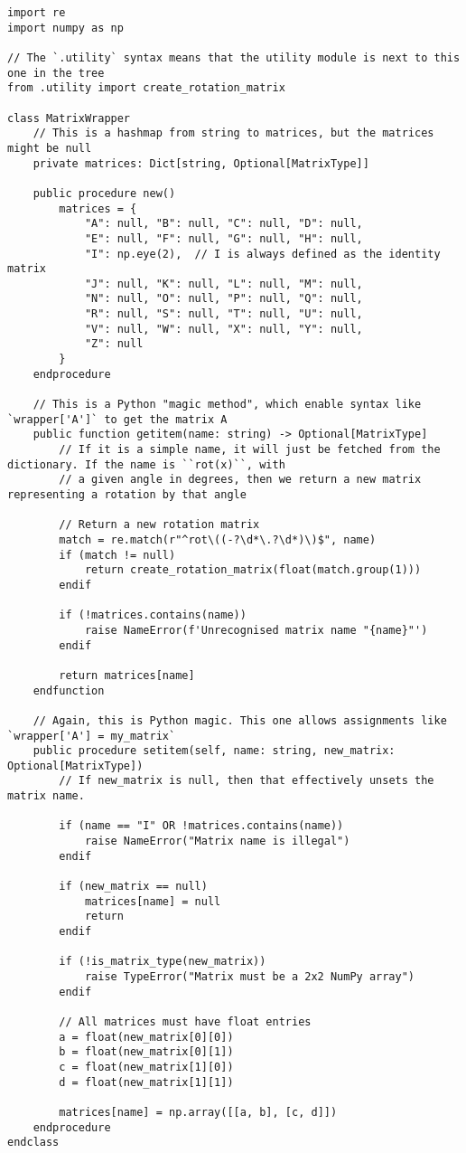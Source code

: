\documentclass[../main.tex]{subfiles}
\begin{document}
\begin{verbatim}
import re
import numpy as np

// The `.utility` syntax means that the utility module is next to this one in the tree
from .utility import create_rotation_matrix

class MatrixWrapper
	// This is a hashmap from string to matrices, but the matrices might be null
	private matrices: Dict[string, Optional[MatrixType]]

	public procedure new()
		matrices = {
			"A": null, "B": null, "C": null, "D": null,
			"E": null, "F": null, "G": null, "H": null,
			"I": np.eye(2),  // I is always defined as the identity matrix
			"J": null, "K": null, "L": null, "M": null,
			"N": null, "O": null, "P": null, "Q": null,
			"R": null, "S": null, "T": null, "U": null,
			"V": null, "W": null, "X": null, "Y": null,
			"Z": null
		}
	endprocedure

	// This is a Python "magic method", which enable syntax like `wrapper['A']` to get the matrix A
	public function getitem(name: string) -> Optional[MatrixType]
		// If it is a simple name, it will just be fetched from the dictionary. If the name is ``rot(x)``, with
		// a given angle in degrees, then we return a new matrix representing a rotation by that angle

		// Return a new rotation matrix
		match = re.match(r"^rot\((-?\d*\.?\d*)\)$", name)
		if (match != null)
			return create_rotation_matrix(float(match.group(1)))
		endif

		if (!matrices.contains(name))
			raise NameError(f'Unrecognised matrix name "{name}"')
		endif

		return matrices[name]
	endfunction

	// Again, this is Python magic. This one allows assignments like `wrapper['A'] = my_matrix`
	public procedure setitem(self, name: string, new_matrix: Optional[MatrixType])
		// If new_matrix is null, then that effectively unsets the matrix name.

		if (name == "I" OR !matrices.contains(name))
			raise NameError("Matrix name is illegal")
		endif

		if (new_matrix == null)
			matrices[name] = null
			return
		endif

		if (!is_matrix_type(new_matrix))
			raise TypeError("Matrix must be a 2x2 NumPy array")
		endif

		// All matrices must have float entries
		a = float(new_matrix[0][0])
		b = float(new_matrix[0][1])
		c = float(new_matrix[1][0])
		d = float(new_matrix[1][1])

		matrices[name] = np.array([[a, b], [c, d]])
	endprocedure
endclass
\end{verbatim}
\end{document}
